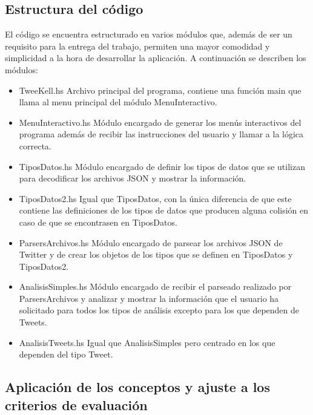 \documentclass[11pt]{article}
\begin{document}
\subsection{Estructura del código}
El código se encuentra estructurado en varios módulos que, además de ser un requisito para la entrega del trabajo, permiten una mayor comodidad y simplicidad a la hora de desarrollar la aplicación.
A continuación se describen los módulos:
 \begin{itemize}
     \item {} TweeKell.hs
     Archivo principal del programa, contiene una función main que llama al menu principal del módulo MenuInteractivo.
     
     \item {} MenuInteractivo.hs
     Módulo encargado de generar los menús interactivos del programa además de recibir las instrucciones del usuario y llamar a la lógica correcta.
     
     \item {} TiposDatos.hs
     Módulo encargado de definir los tipos de datos que se utilizan para decodificar los archivos JSON y mostrar la información.
     
     \item {} TiposDatos2.hs
     Igual que TiposDatos, con la única diferencia de que este contiene las definiciones de los tipos de datos que producen alguna colisión en caso de que se encontrasen en TiposDatos.
     
     \item {} ParsersArchivos.hs
     Módulo encargado de parsear los archivos JSON de Twitter y de crear los objetos de los tipos que se definen en TiposDatos y TiposDatos2.
     
     \item {} AnalisisSimples.hs
     Módulo encargado de recibir el parseado realizado por ParsersArchivos y analizar y mostrar la información que el usuario ha solicitado para todos los tipos de análisis excepto para los que dependen de Tweets.
     
     \item {} AnalisisTweets.hs
     Igual que AnalisisSimples pero centrado en los que dependen del tipo Tweet.
 \end{itemize}


\subsection{Aplicación de los conceptos y ajuste a los criterios de evaluación}\label{aplicacionConceptos}
\end{document}
